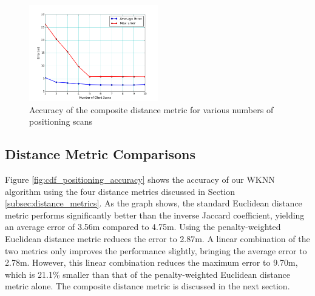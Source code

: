 \documentclass[conference]{IEEEtran}
\begin{document}
\begin{figure}[t!]
  \centering
    \includegraphics[width=0.5\textwidth]{pull_errors.png}
   \caption{Accuracy of the composite distance metric for various numbers of positioning scans}
   \label{fig:composite_accuracy}
\end{figure}

\subsection{Distance Metric Comparisons}
Figure \ref{fig:cdf_positioning_accuracy} shows the accuracy of our WKNN algorithm using the four distance metrics discussed in Section \ref{subsec:distance_metrics}. As the graph shows, the standard Euclidean distance metric performs significantly better than the inverse Jaccard coefficient, yielding an average error of 3.56m compared to 4.75m. Using the penalty-weighted Euclidean distance metric reduces the error to 2.87m. A linear combination of the two metrics only improves the performance slightly, bringing the average error to 2.78m. However, this linear combination reduces the maximum error to 9.70m, which is 21.1\% smaller than that of the penalty-weighted Euclidean distance metric alone. The composite distance metric is discussed in the next section.

\begin{table}[t!]
\renewcommand{\arraystretch}{1.3}
\caption{Distance Metric Accuracy}
\label{tab:table_distance_metric_accuracy}
\centering
{}
\end{table}
\end{document}
